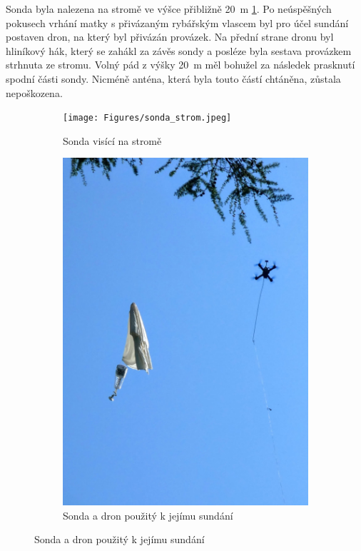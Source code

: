 \documentclass[twoside]{ctuthesis}
\theoremstyle{plain}
\theoremstyle{definition}
\theoremstyle{note}
\begin{document}
	Sonda byla nalezena na stromě ve výšce přibližně 20~m \ref{fig:sonda:strom}. Po neúspěšných pokusech vrhání matky s přivázaným rybářským vlascem byl pro účel sundání postaven dron, na který byl přivázán provázek. Na přední strane dronu byl hliníkový hák, který se zahákl za závěs sondy a posléze byla sestava provázkem strhnuta ze stromu. Volný pád z výšky 20~m měl bohužel za následek prasknutí spodní části sondy. Nicméně anténa, která byla touto částí chtáněna, zůstala nepoškozena.

	\begin{figure}[hbtp]
		\centering
		\begin{subfigure}{.49\textwidth}
			\centering
			\texttt{[image: Figures/sonda\_strom.jpeg]}
			\caption{Sonda visící na stromě}
			\label{fig:sonda:strom}
		\end{subfigure}
		\begin{subfigure}{.49\textwidth}
			\centering
			\includegraphics[height=.8\textwidth]{Figures/sonda_dron.jpeg}
			\caption{Sonda a dron použitý k jejímu sundání}
			\label{fig:sonda:dron}			
		\end{subfigure}
	\end{figure}
	
\end{document}
